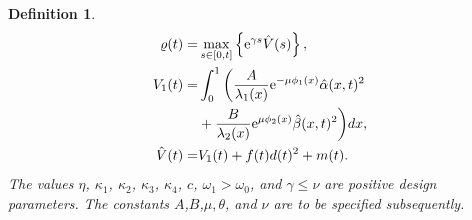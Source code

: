 \documentclass[letterpaper, 10 pt, conference]{ieeeconf}
\newtheorem{definition}{Definition}
\begin{document}
\begin{definition}
\begin{align}
        \varrho(t) =& \max_{s\in[0,t]}\left\{\mathrm{e}^{\gamma s}\hat V(s)\right\},\label{varrho}\\
        V_1(t) =& \int_0^1 \bigg(\frac{A}{\lambda_1(x)}\mathrm{e}^{-\mu\phi_1(x)}\hat \alpha(x,t)^2\notag\\
        &+\frac{B}{\lambda_2(x)}\mathrm{e}^{\mu\phi_2(x)}\hat \beta(x,t)^2\bigg)dx,\label{v1}\\
        \hat V(t) =& V_1(t) + f(t)d(t)^2 + m(t).\label{hat-v}
    \end{align}
    The values $\eta$, $\kappa_1$, $\kappa_2$, $\kappa_3$, $\kappa_4$, $c$, $\omega_1>\omega_0$, and $\gamma\leq \nu$ are positive design parameters. The constants $A$,$B$,$\mu,\theta$, and $\nu$ are to be specified subsequently. 
    \end{definition}
    
\end{document}
